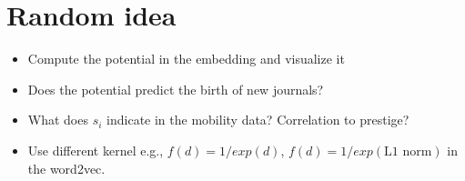 \documentclass[12pt]{article} %
\begin{document}
\section*{Random idea}
\begin{itemize}
    \item Compute the potential in the embedding and visualize it
    \item Does the potential predict the birth of new journals?
    \item What does $s_i$ indicate in the mobility data? Correlation to prestige?
    \item Use different kernel e.g., $f(d) = 1/exp(d)$, $f(d)=1/exp(\text{L1 norm})$ in the word2vec.
\end{itemize}

\printbibliography{}
   
\end{document}
